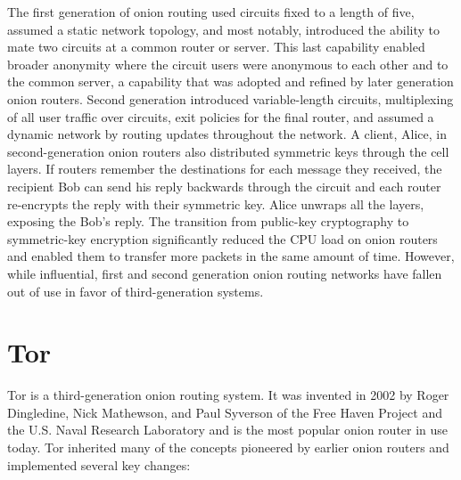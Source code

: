 The first generation of onion routing used circuits fixed to a length of five, assumed a static network topology, and most notably, introduced the ability to mate two circuits at a common router or server. This last capability enabled broader anonymity where the circuit users were anonymous to each other and to the common server, a capability that was adopted and refined by later generation onion routers. Second generation introduced variable-length circuits, multiplexing of all user traffic over circuits, exit policies for the final router, and assumed a dynamic network by routing updates throughout the network. A client, Alice, in second-generation onion routers also distributed symmetric keys through the cell layers. If routers remember the destinations for each message they received, the recipient Bob can send his reply backwards through the circuit and each router re-encrypts the reply with their symmetric key. Alice unwraps all the layers, exposing the Bob's reply. The transition from public-key cryptography to symmetric-key encryption significantly reduced the CPU load on onion routers and enabled them to transfer more packets in the same amount of time. However, while influential, first and second generation onion routing networks have fallen out of use in favor of third-generation systems.\cite{syverson2011peel}

\section{Tor}

Tor is a third-generation onion routing system. It was invented in 2002 by Roger Dingledine, Nick Mathewson, and Paul Syverson of the Free Haven Project and the U.S. Naval Research Laboratory\cite{dingledine2004tor} and is the most popular onion router in use today. Tor inherited many of the concepts pioneered by earlier onion routers and implemented several key changes:\cite{syverson2011peel}\cite{dingledine2004tor}

